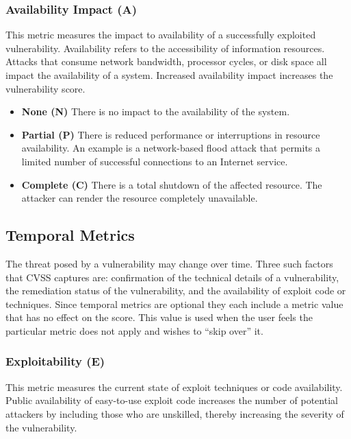     \subsubsection{Availability Impact (A)}\label{subsec:availability-impact-a}

    This metric measures the impact to availability of a successfully
    exploited vulnerability. Availability refers to the accessibility of
    information resources. Attacks that consume network bandwidth, processor
    cycles, or disk space all impact the availability of a system. Increased
    availability impact increases the vulnerability score.

    \begin{itemize}
      \item
        \textbf{None (N)} There is no impact to the availability of the
        system.
      \item
        \textbf{Partial (P)} There is reduced performance or interruptions in
        resource availability. An example is a network-based flood attack that
        permits a limited number of successful connections to an Internet
        service.
      \item
        \textbf{Complete (C)} There is a total shutdown of the affected
        resource. The attacker can render the resource completely unavailable.
    \end{itemize}

    \subsection{Temporal Metrics}\label{subsec:temporal-metrics}

    The threat posed by a vulnerability may change over time. Three such
    factors that CVSS captures are: confirmation of the technical details of
    a vulnerability, the remediation status of the vulnerability, and the
    availability of exploit code or techniques. Since temporal metrics are
    optional they each include a metric value that has no effect on the
    score. This value is used when the user feels the particular metric does
    not apply and wishes to ``skip over'' it.

    \subsubsection{Exploitability (E)}\label{subsec:exploitability-e}

    This metric measures the current state of exploit techniques or code
    availability. Public availability of easy-to-use exploit code increases
    the number of potential attackers by including those who are unskilled,
    thereby increasing the severity of the vulnerability.

